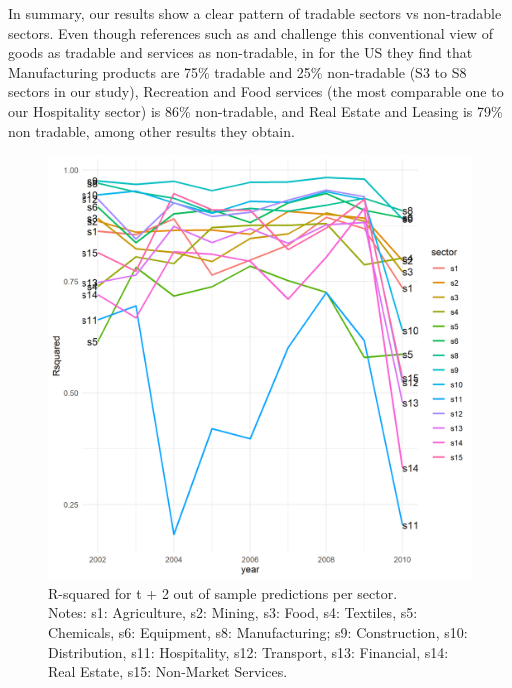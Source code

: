\documentclass[]{interact}
\theoremstyle{plain}%
\theoremstyle{definition}
\theoremstyle{remark}
\begin{document}
In summary, our results show a clear pattern of tradable sectors vs
non-tradable sectors. Even though references such as
\citet{gervais2019tradability} and \citet{jensen2005} challenge this
conventional view of goods as tradable and services as non-tradable, in
\citet{gervais2019tradability} for the US they find that Manufacturing
products are 75\% tradable and 25\% non-tradable (S3 to S8 sectors in
our study), Recreation and Food services (the most comparable one to our
Hospitality sector) is 86\% non-tradable, and Real Estate and Leasing is
79\% non tradable, among other results they obtain.

\begin{figure}[p]
\includegraphics[width=1\linewidth]{figures/sector_rsquared} \caption{\label{rsquared_sectors}R-squared for t + 2 out of sample predictions per sector.\\\hspace{\textwidth}\tiny Notes: s1: Agriculture, s2: Mining, s3: Food, s4: Textiles, s5: Chemicals, s6: Equipment, s8: Manufacturing; s9: Construction, s10: Distribution, s11: Hospitality, s12:  Transport, s13: Financial, s14: Real Estate, s15: Non-Market Services.}\label{fig:unnamed-chunk-9}
\end{figure}
\end{document}
